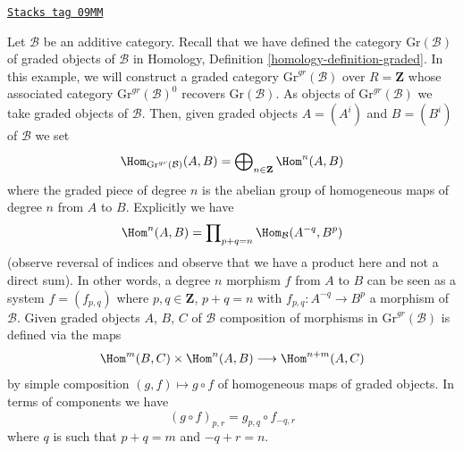 \begin{example}

\label{dga-example-graded-category-graded-objects}
\href{https://stacks.math.columbia.edu/tag/09MM}{\texttt{Stacks tag 09MM}}

Let $\mathcal{B}$ be an additive category. Recall that we have defined
the category $\text{Gr}(\mathcal{B})$ of graded objects of $\mathcal{B}$ in
Homology, Definition \ref{homology-definition-graded}.
In this example, we will construct a graded category
$\text{Gr}^{gr}(\mathcal{B})$ over $R = \mathbf{Z}$
whose associated category $\text{Gr}^{gr}(\mathcal{B})^0$
recovers $\text{Gr}(\mathcal{B})$.
As objects of $\text{Gr}^{gr}(\mathcal{B})$
we take graded objects of $\mathcal{B}$. Then, given graded objects
$A = (A^i)$ and $B = (B^i)$ of $\mathcal{B}$ we set
$$
\Hom_{\text{Gr}^{gr}(\mathcal{B})}(A, B) =
\bigoplus\nolimits_{n \in \mathbf{Z}} \Hom^n(A, B)
$$
where the graded piece of degree $n$ is the abelian group of homogeneous
maps of degree $n$ from $A$ to $B$. Explicitly we have
$$
\Hom^n(A, B) = \prod\nolimits_{p + q = n} \Hom_\mathcal{B}(A^{-q}, B^p)
$$
(observe reversal of indices and observe that we have a product here and
not a direct sum). In other words, a degree $n$ morphism $f$
from $A$ to $B$ can be seen as a system $f = (f_{p, q})$ where
$p, q \in \mathbf{Z}$, $p + q = n$ with
$f_{p, q} : A^{-q} \to B^p$ a morphism of $\mathcal{B}$.
Given graded objects $A$, $B$, $C$ of $\mathcal{B}$
composition of morphisms in $\text{Gr}^{gr}(\mathcal{B})$ is defined
via the maps
$$
\Hom^m(B, C) \times \Hom^n(A, B) \longrightarrow \Hom^{n + m}(A, C)
$$
by simple composition $(g, f) \mapsto g \circ f$ of homogeneous
maps of graded objects. In terms of components we have
$$
(g \circ f)_{p, r} = g_{p, q} \circ f_{-q, r}
$$
where $q$ is such that $p + q = m$ and $-q + r = n$.
\end{example}

